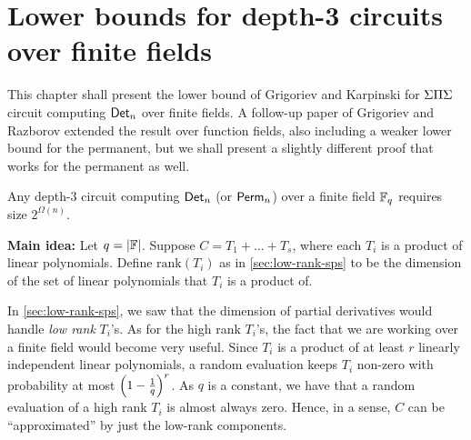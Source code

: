 \chapter{Lower bounds for depth-3 circuits over finite fields}\label{chap:GK}

This chapter shall present the lower bound of Grigoriev and Karpinski
\cite{grigoriev98} for $\Sigma\Pi\Sigma$ circuit computing $\mathsf{Det}_n$ over finite
fields. A follow-up paper of Grigoriev and Razborov \cite{gr00}
extended the result over function fields, also including a weaker
lower bound for the permanent, but we shall present a slightly
different proof that works for the permanent as well.

\begin{theorem}\cite{grigoriev98}\label{thm:gk-main-thm}
  Any depth-3 circuit computing $\mathsf{Det}_n$ (or $\mathsf{Perm}_n$) over a finite
  field $\mathbb{F}_q$ requires size $2^{\Omega(n)}$.
\end{theorem}


{\bf Main idea:} Let $q = |\mathbb{F}|$. Suppose $C = T_1 + \dots + T_s$,
where each $T_i$ is a product of linear polynomials. Define
$\mathrm{rank}(T_i)$ as in \autoref{sec:low-rank-sps} to be the
dimension of the set of linear polynomials that $T_i$ is a product of.

In \autoref{sec:low-rank-sps}, we saw that the dimension of partial
derivatives would handle \emph{low rank} $T_i$'s. As for the high rank
$T_i$'s, the fact that we are working over a finite field would become
very useful. Since $T_i$ is a product of at least $r$ linearly
independent linear polynomials, a random evaluation keeps $T_i$
non-zero with probability at most $\left(1-\frac{1}{q}\right)^r$. As $q$
is a constant, we have that a random evaluation of a high rank $T_i$
is almost always zero. Hence, in a sense, $C$ can be ``approximated''
by just the low-rank components.


